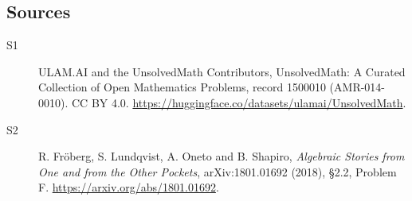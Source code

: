 \documentclass[11pt]{article}
\begin{document}
\subsection{Sources}
\begin{description}
\item[\hypertarget{source:1500010:1}{S1}] ULAM.AI and the UnsolvedMath Contributors, UnsolvedMath: A Curated Collection of Open Mathematics Problems, record 1500010 (AMR-014-0010). CC BY 4.0. \url{https://huggingface.co/datasets/ulamai/UnsolvedMath}.
\item[\hypertarget{source:1500010:2}{S2}] R. Fröberg, S. Lundqvist, A. Oneto and B. Shapiro, \emph{Algebraic Stories from One and from the Other Pockets}, arXiv:1801.01692 (2018), §2.2, Problem F. \url{https://arxiv.org/abs/1801.01692}.
\end{description}
\label{end:1500010}
\end{document}
